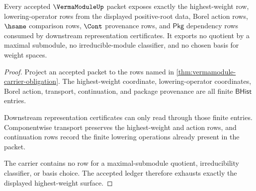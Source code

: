 \begin{theorem}
\label{thm:vermamodule-highest-weight-ledger}
Every accepted $\VermaModuleUp$ packet exposes exactly the highest-weight row,
lowering-operator rows from the displayed positive-root data, Borel action
rows, $\hsame$ comparison rows, $\Cont$ provenance rows, and $\mathsf{Pkg}$
dependency rows consumed by downstream representation certificates. It exports
no quotient by a maximal submodule, no irreducible-module classifier, and no
chosen basis for weight spaces.
\end{theorem}
\begin{proof}
Project an accepted packet to the rows named in
\autoref{thm:vermamodule-carrier-obligation}. The highest-weight coordinate,
lowering-operator coordinates, Borel action, transport, continuation, and
package provenance are all finite $\mathsf{BHist}$ entries.

Downstream representation certificates can only read through those finite
entries. Componentwise transport preserves the highest-weight and action rows,
and continuation rows record the finite lowering operations already present in
the packet.

The carrier contains no row for a maximal-submodule quotient, irreducibility
classifier, or basis choice. The accepted ledger therefore exhausts exactly the
displayed highest-weight surface.
\end{proof}

